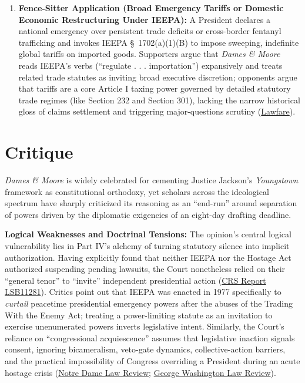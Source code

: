 \documentclass[12pt]{article}
\begin{document}
\begin{enumerate}
  \item \textbf{Fence-Sitter Application (Broad Emergency Tariffs or Domestic Economic Restructuring Under IEEPA):} A President declares a national emergency over persistent trade deficits or cross-border fentanyl trafficking and invokes IEEPA \S\ 1702(a)(1)(B) to impose sweeping, indefinite global tariffs on imported goods. Supporters argue that \textit{Dames \& Moore} reads IEEPA's verbs (``regulate . . . importation'') expansively and treats related trade statutes as inviting broad executive discretion; opponents argue that tariffs are a core Article I taxing power governed by detailed statutory trade regimes (like Section 232 and Section 301), lacking the narrow historical gloss of claims settlement and triggering major-questions scrutiny (\href{https://www.lawfaremedia.org/article/the-case-against-ieepa-tariffs}{Lawfare}).
\end{enumerate}

\section{Critique}
\textit{Dames \& Moore} is widely celebrated for cementing Justice Jackson's \textit{Youngstown} framework as constitutional orthodoxy, yet scholars across the ideological spectrum have sharply criticized its reasoning as an ``end-run'' around separation of powers driven by the diplomatic exigencies of an eight-day drafting deadline.

\textbf{Logical Weaknesses and Doctrinal Tensions:} The opinion's central logical vulnerability lies in Part IV's alchemy of turning statutory silence into implicit authorization. Having explicitly found that neither IEEPA nor the Hostage Act authorized suspending pending lawsuits, the Court nonetheless relied on their ``general tenor'' to ``invite'' independent presidential action (\href{https://www.everycrsreport.com/reports/LSB11281.html}{CRS Report LSB11281}). Critics point out that IEEPA was enacted in 1977 specifically to \textit{curtail} peacetime presidential emergency powers after the abuses of the Trading With the Enemy Act; treating a power-limiting statute as an invitation to exercise unenumerated powers inverts legislative intent. Similarly, the Court's reliance on ``congressional acquiescence'' assumes that legislative inaction signals consent, ignoring bicameralism, veto-gate dynamics, collective-action barriers, and the practical impossibility of Congress overriding a President during an acute hostage crisis (\href{https://scholarship.law.nd.edu/cgi/viewcontent.cgi?article=4590&context=ndlr}{Notre Dame Law Review}; \href{https://www.gwlr.org/wp-content/uploads/2016/06/84-Geo.-Was.-L.-Rev.-668.pdf}{George Washington Law Review}).
\end{document}

